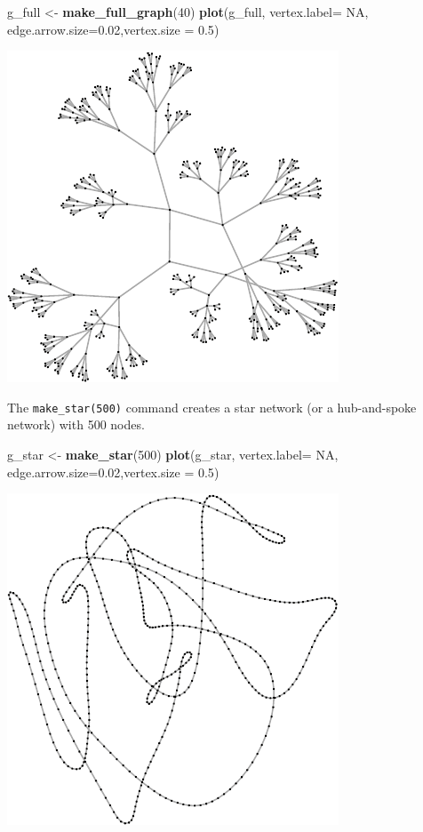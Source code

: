 \documentclass[]{article}
\newenvironment{Shaded}{\begin{snugshade}}{\end{snugshade}}
\newcommand{\KeywordTok}[1]{\textcolor[rgb]{0.13,0.29,0.53}{\textbf{{#1}}}}
\newcommand{\DataTypeTok}[1]{\textcolor[rgb]{0.13,0.29,0.53}{{#1}}}
\newcommand{\DecValTok}[1]{\textcolor[rgb]{0.00,0.00,0.81}{{#1}}}
\newcommand{\FloatTok}[1]{\textcolor[rgb]{0.00,0.00,0.81}{{#1}}}
\newcommand{\StringTok}[1]{\textcolor[rgb]{0.31,0.60,0.02}{{#1}}}
\newcommand{\OtherTok}[1]{\textcolor[rgb]{0.56,0.35,0.01}{{#1}}}
\newcommand{\NormalTok}[1]{{#1}}
\theoremstyle{definition}
\theoremstyle{definition}
\theoremstyle{definition}
\theoremstyle{remark}
\begin{document}
\begin{Shaded}
\begin{Highlighting}[]
\NormalTok{g_full <-}\StringTok{ }\KeywordTok{make_full_graph}\NormalTok{(}\DecValTok{40}\NormalTok{)}
\KeywordTok{plot}\NormalTok{(g_full, }\DataTypeTok{vertex.label=} \OtherTok{NA}\NormalTok{, }\DataTypeTok{edge.arrow.size=}\FloatTok{0.02}\NormalTok{,}\DataTypeTok{vertex.size =} \FloatTok{0.5}\NormalTok{)}
\end{Highlighting}
\end{Shaded}

\includegraphics{ResearchTools_files/figure-latex/unnamed-chunk-52-1.pdf}

The \texttt{make\_star(500)} command creates a star network (or a
hub-and-spoke network) with 500 nodes.

\begin{Shaded}
\begin{Highlighting}[]
\NormalTok{g_star <-}\StringTok{ }\KeywordTok{make_star}\NormalTok{(}\DecValTok{500}\NormalTok{)}
\KeywordTok{plot}\NormalTok{(g_star, }\DataTypeTok{vertex.label=} \OtherTok{NA}\NormalTok{, }\DataTypeTok{edge.arrow.size=}\FloatTok{0.02}\NormalTok{,}\DataTypeTok{vertex.size =} \FloatTok{0.5}\NormalTok{)}
\end{Highlighting}
\end{Shaded}

\includegraphics{ResearchTools_files/figure-latex/unnamed-chunk-53-1.pdf}
\end{document}
